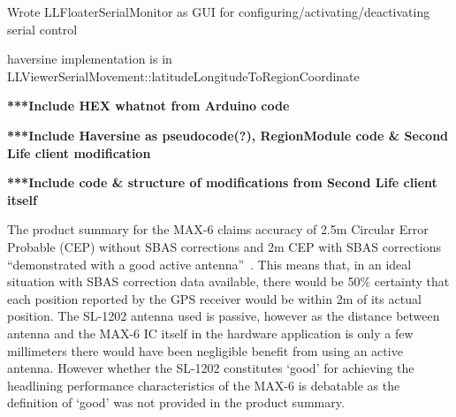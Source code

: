 Wrote LLFloaterSerialMonitor as GUI for configuring/activating/deactivating serial control


haversine implementation is in LLViewerSerialMovement::latitudeLongitudeToRegionCoordinate













\textbf{***Include HEX whatnot from Arduino code}

\textbf{***Include Haversine as pseudocode(?), RegionModule code \& Second Life client modification}











\textbf{***Include code \& structure of modifications from Second Life client itself}



The product summary for the MAX-6 claims accuracy of 2.5m Circular Error Probable (CEP) without SBAS corrections and 2m CEP with SBAS corrections ``demonstrated with a good active antenna''~\cite{U-bloxAG2012}. This means that, in an ideal situation with SBAS correction data available, there would be 50\% certainty that each position reported by the GPS receiver would be within 2m of its actual position. The SL-1202 antenna used is passive, however as the distance between antenna and the MAX-6 IC itself in the hardware application is only a few millimeters there would have been negligible benefit from using an active antenna. However whether the SL-1202 constitutes `good' for achieving the headlining performance characteristics of the MAX-6 is debatable as the definition of `good' was not provided in the product summary.

